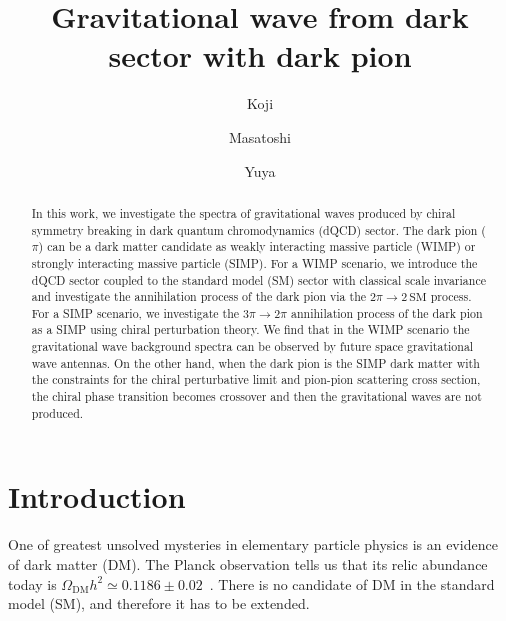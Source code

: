 \documentclass[a4paper,preprint,superscriptaddress,preprintnumbers,nofootinbib]{revtex4}
\begin{document}
\title{Gravitational wave from dark sector with dark pion}

\author{Koji }

\author{Masatoshi }

\author{Yuya }

\begin{abstract}
In this work, we investigate the spectra of gravitational waves produced by chiral symmetry breaking in dark quantum chromodynamics (dQCD) sector.
The dark pion ($\pi$) can be a dark matter candidate as weakly interacting massive particle (WIMP) or strongly interacting massive particle (SIMP).
For a WIMP scenario, we introduce the dQCD sector coupled to the standard model (SM) sector with classical scale invariance and investigate the annihilation process of the dark pion via the $2\pi \to 2\,\text{SM}$ process.
For a SIMP scenario, we investigate the $3\pi \to 2\pi$ annihilation process of the dark pion as a SIMP using chiral perturbation theory.
We find that in the WIMP scenario the gravitational wave background spectra can be observed by future space gravitational wave antennas.
On the other hand, when the dark pion is the SIMP dark matter with the constraints for the chiral perturbative limit and pion-pion scattering cross section, the chiral phase transition becomes crossover and then the gravitational waves are not produced.
\end{abstract}
\maketitle

\newpage
\section{Introduction}
One of greatest unsolved mysteries in elementary particle physics is an evidence of  dark matter (DM).
The Planck observation tells us that its relic abundance today is $\Omega_\text{DM}h^2\simeq 0.1186\pm 0.02$~\cite{Ade:2015xua}.
There is no candidate of DM in the standard model (SM), and therefore it has to be extended.
\end{document}
